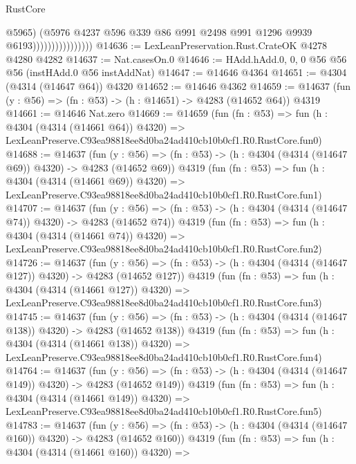 \begin{lexlean}{RustCore}
\begin{coremodule}
                                    @5965)
                                  (@5976
                                    @4237
                                    @596
                                    @339
                                    @86
                                    @991
                                    @2498
                                    @991
                                    @1296
                                    @9939
                                    @6193))))))))))))))))
@14636 := LexLeanPreservation.Rust.CrateOK @4278 @4280 @4282
@14637 := Nat.casesOn.{0}
@14646 := HAdd.hAdd.{0, 0, 0} @56 @56 @56 (instHAdd.{0} @56 instAddNat)
@14647 := @14646 @4364
@14651 := @4304 (@4314 (@14647 @64)) @4320
@14652 := @14646 @4362
@14659 := @14637 (fun (y : @56) => (fn : @53) -> (h : @14651) -> @4283 (@14652 @64)) @4319
@14661 := @14646 Nat.zero
@14669 := @14659
    (fun (fn : @53) =>
    fun (h : @4304 (@4314 (@14661 @64)) @4320) =>
    LexLeanPreserve.C93ea98818ee8d0ba24ad410cb10b0cf1.R0.RustCore.fun0)
@14688 := @14637
    (fun (y : @56) => (fn : @53) -> (h : @4304 (@4314 (@14647 @69)) @4320) -> @4283 (@14652 @69))
    @4319
    (fun (fn : @53) =>
    fun (h : @4304 (@4314 (@14661 @69)) @4320) =>
    LexLeanPreserve.C93ea98818ee8d0ba24ad410cb10b0cf1.R0.RustCore.fun1)
@14707 := @14637
    (fun (y : @56) => (fn : @53) -> (h : @4304 (@4314 (@14647 @74)) @4320) -> @4283 (@14652 @74))
    @4319
    (fun (fn : @53) =>
    fun (h : @4304 (@4314 (@14661 @74)) @4320) =>
    LexLeanPreserve.C93ea98818ee8d0ba24ad410cb10b0cf1.R0.RustCore.fun2)
@14726 := @14637
    (fun (y : @56) => (fn : @53) -> (h : @4304 (@4314 (@14647 @127)) @4320) -> @4283 (@14652 @127))
    @4319
    (fun (fn : @53) =>
    fun (h : @4304 (@4314 (@14661 @127)) @4320) =>
    LexLeanPreserve.C93ea98818ee8d0ba24ad410cb10b0cf1.R0.RustCore.fun3)
@14745 := @14637
    (fun (y : @56) => (fn : @53) -> (h : @4304 (@4314 (@14647 @138)) @4320) -> @4283 (@14652 @138))
    @4319
    (fun (fn : @53) =>
    fun (h : @4304 (@4314 (@14661 @138)) @4320) =>
    LexLeanPreserve.C93ea98818ee8d0ba24ad410cb10b0cf1.R0.RustCore.fun4)
@14764 := @14637
    (fun (y : @56) => (fn : @53) -> (h : @4304 (@4314 (@14647 @149)) @4320) -> @4283 (@14652 @149))
    @4319
    (fun (fn : @53) =>
    fun (h : @4304 (@4314 (@14661 @149)) @4320) =>
    LexLeanPreserve.C93ea98818ee8d0ba24ad410cb10b0cf1.R0.RustCore.fun5)
@14783 := @14637
    (fun (y : @56) => (fn : @53) -> (h : @4304 (@4314 (@14647 @160)) @4320) -> @4283 (@14652 @160))
    @4319
    (fun (fn : @53) =>
    fun (h : @4304 (@4314 (@14661 @160)) @4320) =>

\end{coremodule}
\end{lexlean}
